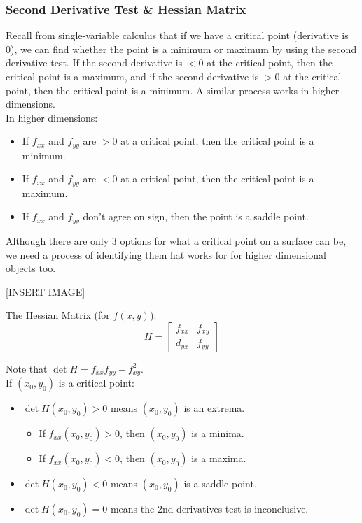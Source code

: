 \subsubsection{Second Derivative Test \& Hessian Matrix}
\noindent
Recall from single-variable calculus that if we have a critical point (derivative is 0), we can find whether the point is a minimum or maximum by using the second derivative test. If the second derivative is $<0$ at the critical point, then the critical point is a maximum, and if the second derivative is $>0$ at the critical point, then the critical point is a minimum. A similar process works in higher dimensions.\\

\noindent
In higher dimensions:
\begin{itemize}
	\item If $f_{xx}$ and $f_{yy}$ are $>0$ at a critical point, then the critical point is a minimum.
	\item If $f_{xx}$ and $f_{yy}$ are $<0$ at a critical point, then the critical point is a maximum.
	\item If $f_{xx}$ and $f_{yy}$ don't agree on sign, then the point is a saddle point.
\end{itemize}

\noindent
Although there are only 3 options for what a critical point on a surface can be, we need a process of identifying them hat works for for higher dimensional objects too.

[INSERT IMAGE]

\begin{definition}
	The Hessian Matrix (for $f(x,y)$): $$H=\begin{bmatrix}f_{xx} & f_{xy} \\d_{yx} & f_{yy} \end{bmatrix}$$
\end{definition}
\noindent
Note that $\det{H}=f_{xx}f_{yy}-f_{xy}^2$.\\

\noindent
If $(x_0,y_0)$ is a critical point:
\begin{itemize}
	\item $\det{H(x_0,y_0)>0}$ means $(x_0,y_0)$ is an extrema. 
	\begin{itemize}
		\item If $f_{xx}(x_0,y_0)>0$, then $(x_0,y_0)$ is a minima.
		\item If $f_{xx}(x_0,y_0)<0$, then $(x_0,y_0)$ is a maxima.
	\end{itemize}
	\item $\det{H(x_0,y_0)}<0$ means $(x_0,y_0)$ is a saddle point.
	\item $\det{H(x_0,y_0)}=0$ means the 2nd derivatives test is inconclusive.
\end{itemize}
